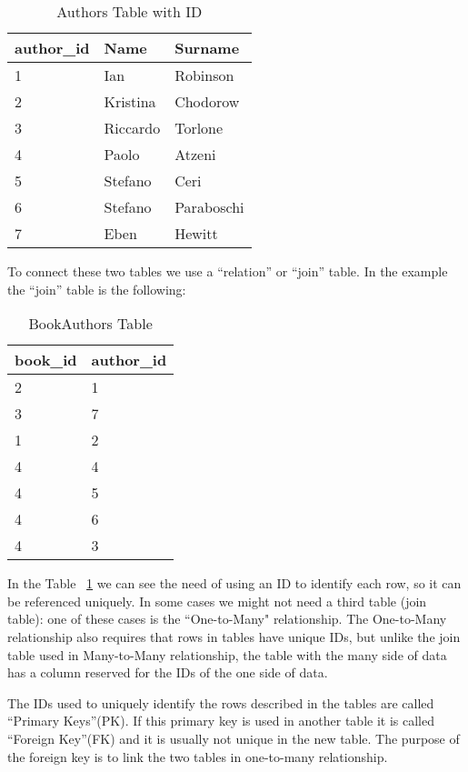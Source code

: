 \documentclass[a4page, 11pt]{article}
\begin{document}
\begin{table}[h]
	\centering
	\begin{tabular}{|l|l|l|}
		\hline
		
		\textbf{author\_id} & \textbf{Name} & \textbf{Surname}\\ 
		\hline
		1 & Ian & Robinson\\
		\hline
		2 & Kristina & Chodorow\\ 
		\hline
		3 & Riccardo & Torlone\\
		\hline
		4 & Paolo & Atzeni\\
		\hline
		5 & Stefano & Ceri\\
		\hline
		6 & Stefano & Paraboschi\\
		\hline
		7 & Eben & Hewitt\\
		\hline
		
	\end{tabular}
	\caption{Authors Table with ID}
\end{table}

To connect these two tables we use a ``relation'' or ``join'' table. In the example the ``join'' table is the following:
\pagebreak
\begin{table}[h]
	\centering
	\begin{tabular}{|l|l|}
		\hline
		
		\textbf{book\_id} & \textbf{author\_id} \\
		\hline
		2 & 1\\
		\hline
		3 & 7\\
		\hline
		1 & 2\\
		\hline
		4 & 4\\
		\hline
		4 & 5\\
		\hline
		4 & 6\\
		\hline
		4 & 3\\
		\hline
	\end{tabular}
	\caption{BookAuthors Table}
	\label{table:join}
\end{table}

In the Table ~\ref{table:join} we can see the need of using an ID to identify each row, so it can be referenced uniquely. 
In some cases we might not need a third table (join table): one of these cases is the ``One-to-Many" relationship. 
The One-to-Many relationship also requires that rows in tables have unique IDs, but unlike the join table used in Many-to-Many relationship, the table with the many side of data has a column reserved for the IDs of the one side of data.

The IDs used to uniquely identify the rows described in the tables are called ``Primary Keys''(PK). 
If this primary key is used in another table it is called ``Foreign Key''(FK) and it is usually not unique in the new table. 
The purpose of the foreign key is to link the two tables in one-to-many relationship.
\end{document}
